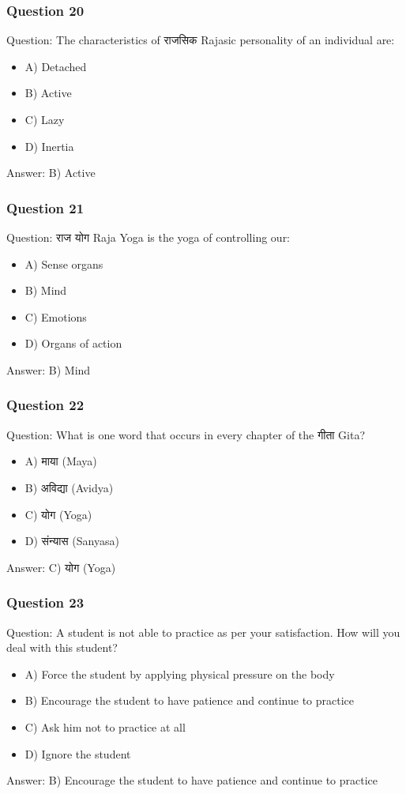 \begin{frame}[fragile]\frametitle{Question 20}
Question: The characteristics of राजसिक Rajasic personality of an individual are:
\begin{itemize}
\item A) Detached
\item B) Active
\item C) Lazy
\item D) Inertia
\end{itemize}
Answer: B) Active
\end{frame}

\begin{frame}[fragile]\frametitle{Question 21}
Question: राज योग Raja Yoga is the yoga of controlling our:
\begin{itemize}
\item A) Sense organs
\item B) Mind
\item C) Emotions
\item D) Organs of action
\end{itemize}
Answer: B) Mind
\end{frame}

\begin{frame}[fragile]\frametitle{Question 22}
Question: What is one word that occurs in every chapter of the गीता Gita?
\begin{itemize}
\item A) माया (Maya)
\item B) अविद्या (Avidya)
\item C) योग (Yoga)
\item D) संन्यास (Sanyasa)
\end{itemize}
Answer: C) योग (Yoga)
\end{frame}


\begin{frame}[fragile]\frametitle{Question 23}
Question: A student is not able to practice as per your satisfaction. How will you deal with this student?
\begin{itemize}
\item A) Force the student by applying physical pressure on the body
\item B) Encourage the student to have patience and continue to practice
\item C) Ask him not to practice at all
\item D) Ignore the student
\end{itemize}
Answer: B) Encourage the student to have patience and continue to practice
\end{frame}

